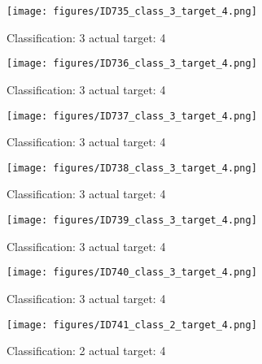 \begin{figure}[h!]
\begin{center}
\texttt{[image: figures/ID735\_class\_3\_target\_4.png]}
\end{center}
\caption{ Classification: 3 actual target: 4}
\label{fig:ID735_class_3_target_4}
\end{figure}
\begin{figure}[h!]
\begin{center}
\texttt{[image: figures/ID736\_class\_3\_target\_4.png]}
\end{center}
\caption{ Classification: 3 actual target: 4}
\label{fig:ID736_class_3_target_4}
\end{figure}
\begin{figure}[h!]
\begin{center}
\texttt{[image: figures/ID737\_class\_3\_target\_4.png]}
\end{center}
\caption{ Classification: 3 actual target: 4}
\label{fig:ID737_class_3_target_4}
\end{figure}
\begin{figure}[h!]
\begin{center}
\texttt{[image: figures/ID738\_class\_3\_target\_4.png]}
\end{center}
\caption{ Classification: 3 actual target: 4}
\label{fig:ID738_class_3_target_4}
\end{figure}
\begin{figure}[h!]
\begin{center}
\texttt{[image: figures/ID739\_class\_3\_target\_4.png]}
\end{center}
\caption{ Classification: 3 actual target: 4}
\label{fig:ID739_class_3_target_4}
\end{figure}
\begin{figure}[h!]
\begin{center}
\texttt{[image: figures/ID740\_class\_3\_target\_4.png]}
\end{center}
\caption{ Classification: 3 actual target: 4}
\label{fig:ID740_class_3_target_4}
\end{figure}
\begin{figure}[h!]
\begin{center}
\texttt{[image: figures/ID741\_class\_2\_target\_4.png]}
\end{center}
\caption{ Classification: 2 actual target: 4}
\label{fig:ID741_class_2_target_4}
\end{figure}
